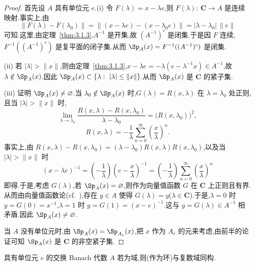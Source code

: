 \begin{proof}
首先设 $A$ 具有单位元 $e$.(i) 令 $F(\lambda) = x - \lambda e$,则 $F(\lambda):\ \mathbf{C} \to A$ 是连续映射.事实上,由
\begin{equation*}
\|F(\lambda) - F(\lambda_{0})\| = \|(x - \lambda e) - (x - \lambda_{0}e)\| = |\lambda - \lambda_{0}|\,\|e\|
\end{equation*}
可知.这里,由定理~\ref{thm:3.1.3},$A^{-1}$ 是开集,故 $(A^{-1})^{c}$ 是闭集.于是因 $F$ 连续,$F^{-1}((A^{-1})^{c})$ 是复平面的闭子集.从而 $\Sp_{A}(x) = F^{-1}((A^{-1})^{c})$ 是闭集.

(ii) 若 $|\lambda| > \|x\|$,则由定理~\ref{thm:3.1.3},$x - \lambda e = -\lambda(e - \lambda^{-1}x) \in A^{-1}$,故 $\lambda \notin \Sp_{A}(x)$.因此 $\Sp_{A}(x) \subset \{\lambda:\ |\lambda| \leq \|x\|\}$.从而 $\Sp_{A}(x)$ 是 $\mathbf{C}$ 的紧子集.

(iii) 证明 $\Sp_{A}(x) \neq \emptyset$.当 $\lambda_{0} \notin \Sp_{A}(x)$ 时,$G(\lambda) = R(x, \lambda)$ 在 $\lambda = \lambda_{0}$ 处正则,且当 $|\lambda| > \|x\|$ 时,
\begin{equation*}
\lim_{\lambda \to \lambda_{0}} \frac{R(x, \lambda) - R(x, \lambda_{0})}{\lambda - \lambda_{0}} = \bigl(R(x, \lambda_{0})\bigr)^{2},
\end{equation*}
\begin{equation*}
R(x, \lambda) = -\frac{1}{\lambda}\sum_{n=0}^{\infty}\left(\frac{x}{\lambda}\right)^{n}.
\end{equation*}
事实上,由 $R(x, \lambda) - R(x, \lambda_{0}) = (\lambda - \lambda_{0})R(x, \lambda)R(x, \lambda_{0})$,以及当 $|\lambda| > \|x\|$ 时
\begin{equation*}
(x - \lambda e)^{-1} = \left(-\frac{1}{\lambda}\right)\left(e - \frac{x}{\lambda}\right)^{-1} = \left(-\frac{1}{\lambda}\right)\sum_{n=0}^{\infty}\left(\frac{x}{\lambda}\right)^{n}
\end{equation*}
即得.于是,考虑 $G(\lambda)$,若 $\Sp_{A}(x) = \emptyset$,则作为向量值函数 $G$ 在 $\mathbf{C}$ 上正则且有界.从而由向量值函数论(cf.\ \cite{ch3:3}),存在 $y \in A$ 使得 $G(\lambda) = y$($\lambda \in \mathbf{C}$).于是,$\lambda = 0$ 时 $y = G(0) = x^{-1}$,$\lambda = 1$ 时 $y = G(1) = (x - e)^{-1}$.这与 $y = G(\lambda) \in A^{-1}$ 相矛盾.因此 $\Sp_{A}(x) \neq \emptyset$.

当 $A$ 没有单位元时,由 $\Sp_{A}(x) = \Sp_{A_{e}}(x)$,把 $x$ 作为 $A_{e}$ 的元来考虑,由前半的论证可知 $\Sp_{A}(x)$ 是 $\mathbf{C}$ 的非空紧子集.
\end{proof}

\begin{corollary}\label{cor:3.1.7}
具有单位元 $e$ 的交换 Banach 代数 $A$ 若为域,则(作为环)与复数域同构.
\end{corollary}


